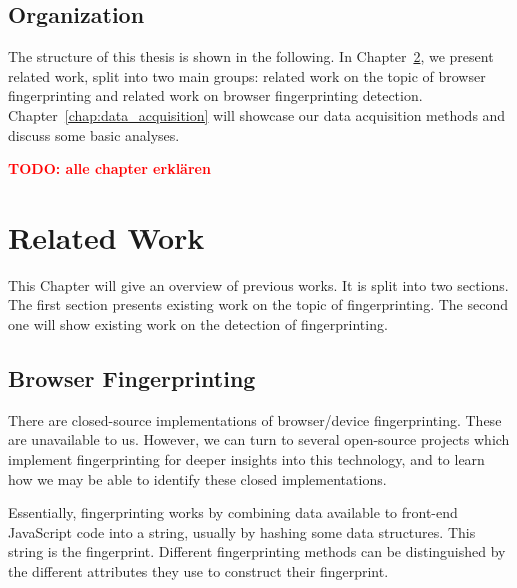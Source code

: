 \documentclass[
    fontsize=12pt,
    headings=small,
    parskip=half,
    bibliography=totoc,
    numbers=noenddot,
    open=any
    ]{scrreprt}
\newcommand{\todo}[1]{\textcolor{red}{\textbf{TODO: #1}}}
\begin{document}
\section{Organization}
The structure of this thesis is shown in the following.
In Chapter~\ref{chap:related_work}, we present related work, split into two main groups:
related work on the topic of browser fingerprinting and related work on
browser fingerprinting detection.
Chapter~\ref{chap:data_acquisition} will showcase our data acquisition
methods and discuss some basic analyses.

\todo{alle chapter erklären}




\chapter{Related Work}
\label{chap:related_work}
This Chapter will give an overview of previous works. It is split into two sections.
The first section presents existing work on the topic of fingerprinting. The second one will show existing work on
the detection of fingerprinting.

\section{Browser Fingerprinting}
There are closed-source implementations of browser/device fingerprinting. These are unavailable to us.
However, we can turn to several open-source projects which implement fingerprinting for deeper insights into this technology,
and to learn how we may be able to identify these closed implementations.

Essentially, fingerprinting works by combining data available to front-end JavaScript code into a string,
usually by hashing some data structures. This string is the fingerprint.
Different fingerprinting methods can be distinguished by the different attributes they use to construct their fingerprint.
\end{document}
